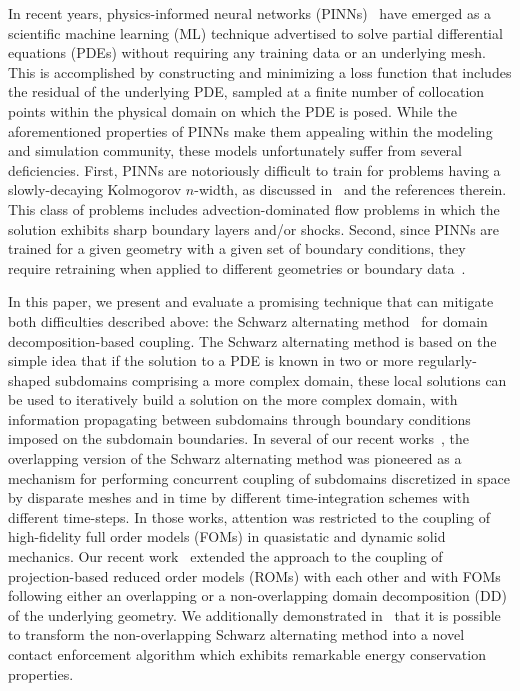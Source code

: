 \documentclass[oneside,final]{csri23}
\begin{document}
In recent years, physics-informed neural networks (PINNs)~\cite{WDS:Raissi2019} have emerged as a scientific machine learning (ML) technique advertised to solve partial differential equations (PDEs) without requiring any training data or an underlying mesh. This is accomplished by constructing and minimizing a loss function that includes the residual of the underlying PDE, sampled at a finite number of collocation points within the physical domain on which the PDE is posed. While the aforementioned properties of PINNs make them appealing within the modeling and simulation community, these models unfortunately suffer from several deficiencies.  First, PINNs are notoriously difficult to train for problems having a slowly-decaying Kolmogorov $n$-width, as discussed in~\cite{WDS:Mojgani:2023} and the references therein.  This class of problems includes advection-dominated flow problems in which the solution exhibits sharp boundary layers and/or shocks. Second, since PINNs are trained for a given geometry with a given set of boundary conditions, they require retraining when applied to different geometries or boundary data~\cite{WDS:Wang:2022}.

In this paper, we present and evaluate a promising technique that can mitigate both difficulties described above: the Schwarz alternating method~\cite{WDS:schwarz1870ueber} for domain decomposition-based coupling. The Schwarz alternating method is based on the simple idea that if the solution to a PDE is known in two or more regularly-shaped subdomains comprising a more complex domain, these local solutions can be used to iteratively build a solution on the more complex domain, with information propagating between subdomains through  boundary conditions imposed on the subdomain boundaries. In several of our recent works~\cite{WDS:mota2017schwarz, WDS:mota2022schwarz}, the overlapping version of the Schwarz alternating method was pioneered as a mechanism for performing concurrent coupling of subdomains discretized in space by disparate meshes and in time by different time-integration schemes with different time-steps. In those works, attention was restricted to the coupling of high-fidelity full order models (FOMs) in quasistatic and dynamic solid mechanics. Our recent work~\cite{WDS:barnett2022schwarz} extended the approach to the coupling of projection-based reduced order models (ROMs) with each other and with FOMs following either an overlapping or a non-overlapping domain decomposition (DD) of the underlying geometry. We additionally demonstrated in~\cite{WDS:Koliesnikova2023, WDS:Hoy2021} that it is possible to transform the non-overlapping Schwarz alternating method into a novel contact enforcement algorithm which exhibits remarkable energy conservation properties.  
\end{document}
